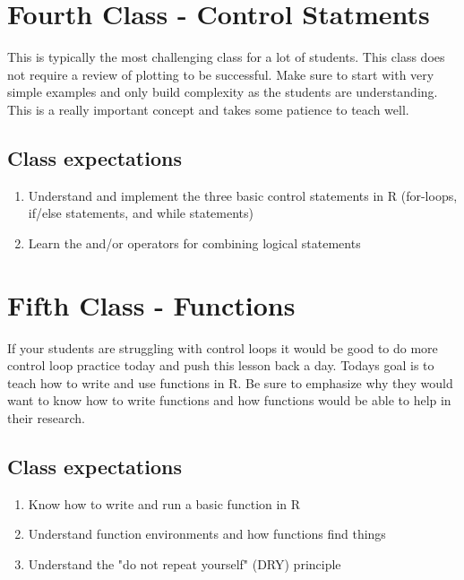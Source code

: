 \documentclass[paper=a4, fontsize=11pt]{scrartcl} %
\numberwithin{equation}{section} %
\numberwithin{figure}{section} %
\numberwithin{table}{section} %
\begin{document}
\section{Fourth Class - Control Statments}

This is typically the most challenging class for a lot of students. This class does not require a review of plotting to be successful. Make sure to start with very simple examples and only build complexity as the students are understanding. This is a really important concept and takes some patience to teach well.  


\subsection{Class expectations}

\begin{enumerate}
\item Understand and implement the three basic control statements in R (for-loops, if/else statements, and while statements)
\item Learn the and/or operators for combining logical statements
\end{enumerate}


\section{Fifth Class - Functions}

If your students are struggling with control loops it would be good to do more control loop practice today and push this lesson back a day. Todays goal is to teach how to write and use functions in R. Be sure to emphasize why they would want to know how to write functions and how functions would be able to help in their research. 


\subsection{Class expectations}

\begin{enumerate}
\item Know how to write and run a basic function in R
\item Understand function environments and how functions find things
\item Understand the "do not repeat yourself" (DRY) principle 
\end{enumerate}
\end{document}
